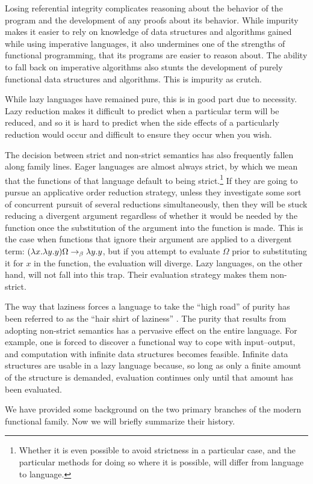 Losing referential integrity complicates reasoning about the behavior of the program and the development of any proofs about its behavior. While impurity makes it easier to rely on knowledge of data structures and algorithms gained while using imperative languages, it also undermines one of the strengths of functional programming, that its programs are easier to reason about. The ability to fall back on imperative algorithms also stunts the development of purely functional data structures and algorithms. This is impurity as crutch.

While lazy languages have remained pure, this is in good part due to necessity. Lazy reduction makes it difficult to predict when a particular term will be reduced, and so it is hard to predict when the side effects of a particularly reduction would occur and difficult to ensure they occur when you wish.

The decision between strict and non-strict semantics has also frequently fallen along family lines. Eager languages are almost always strict, by which we mean that the functions of that language default to being strict.\footnote{Whether it is even possible to avoid strictness in a particular case, and the particular methods for doing so where it is possible, will differ from language to language.} If they are going to pursue an applicative order reduction strategy, unless they investigate some sort of concurrent pursuit of several reductions simultaneously, then they will be stuck reducing a divergent argument regardless of whether it would be needed by the function once the substitution of the argument into the function is made. This is the case when functions that ignore their argument are applied to a divergent term: $(\lambda x. \lambda y. y) \Omega \betared \lambda y.y$, but if you attempt to evaluate $\Omega$ prior to substituting it for $x$ in the function, the evaluation will diverge. Lazy languages, on the other hand, will not fall into this trap. Their evaluation strategy makes them non-strict.

The way that laziness forces a language to take the ``high road'' of purity has been referred to as the ``hair shirt of laziness'' \citep{Peyton-Jones:Wearing:2003}. The purity that results from adopting non-strict semantics has a pervasive effect on the entire language. For example, one is forced to discover a functional way to cope with input--output, and computation with infinite data structures becomes feasible. Infinite data structures are usable in a lazy language because, so long as only a finite amount of the structure is demanded, evaluation continues only until that amount has been evaluated.

We have provided some background on the two primary branches of the modern functional family. Now we will briefly summarize their history.





